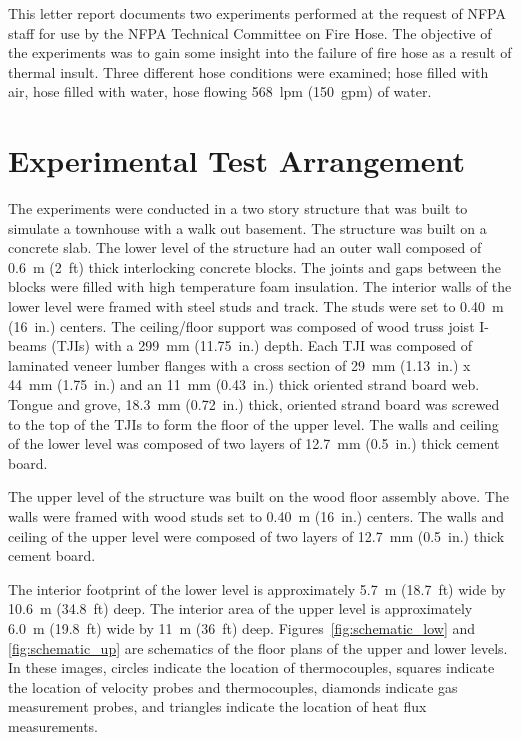 \documentclass[letterpaper,11pt]{texMemo} %
\begin{document}
\maketitle %


This letter report documents two experiments performed at the request of NFPA staff for use by the NFPA Technical Committee on Fire Hose.   The objective of the experiments was to gain some insight into the failure of fire hose as a result of thermal insult.  Three different hose conditions were examined; hose filled with air, hose filled with water, hose flowing 568~lpm (150~gpm) of water. 

\section{Experimental Test Arrangement}
The experiments were conducted in a two story structure that was built to simulate a townhouse with a walk out basement. The structure was built on a concrete slab. The lower level of the structure had an outer wall composed of 0.6~m (2~ft) thick interlocking concrete blocks. The joints and gaps between the blocks were filled with high temperature foam insulation. The interior walls of the lower level were framed with steel studs and track. The studs were set to 0.40~m (16~in.) centers. The ceiling/floor support was composed of wood truss joist I-beams (TJIs) with a 299~mm (11.75~in.) depth. Each TJI was composed of laminated veneer lumber flanges with a cross section of 29~mm (1.13~in.) x 44~mm (1.75~in.) and an 11~mm (0.43~in.) thick oriented strand board web. Tongue and grove, 18.3~mm (0.72~in.) thick, oriented strand board was screwed to the top of the TJIs to form the floor of the upper level. The walls and ceiling of the lower level was composed of two layers of 12.7~mm (0.5~in.) thick cement board. 

The upper level of the structure was built on the wood floor assembly above. The walls were framed with wood studs set to 0.40~m (16~in.) centers. The walls and ceiling of the upper level were composed of two layers of 12.7~mm (0.5~in.) thick cement board.   

The interior footprint of the lower level is approximately 5.7~m (18.7~ft) wide by 10.6~m (34.8~ft) deep. The interior area of the upper level is approximately 6.0~m (19.8~ft) wide by 11~m (36~ft) deep.	 Figures~\ref{fig:schematic_low} and \ref{fig:schematic_up} are schematics of the floor plans of the upper and lower levels. In these images, circles indicate the location of thermocouples, squares indicate the location of velocity probes and thermocouples, diamonds indicate gas measurement probes, and triangles indicate the location of heat flux measurements.
\end{document}
